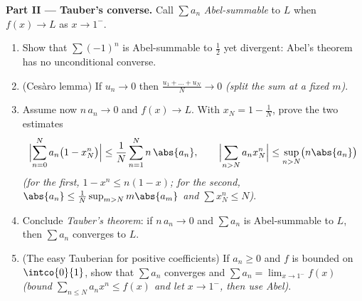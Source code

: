 \begin{problem}
\medskip
\noindent\textbf{Part II --- Tauber's converse.} Call $\sum
a_n$ \emph{Abel-summable} to $L$ when $f(x) \to L$ as $x \to
1^-$.
\begin{enumerate}[resume]
  \item Show that $\sum (-1)^n$ is Abel-summable to $\frac12$
        yet divergent: Abel's theorem has no unconditional
        converse.
  \item (Ces\`aro lemma) If $u_n \to 0$ then $\frac{u_1 + \dots
        + u_N}{N} \to 0$ \emph{(split the sum at a fixed $m$)}.
  \item Assume now $n\,a_n \to 0$ and $f(x) \to L$. With $x_N =
        1 - \frac1N$, prove the two estimates
        \[
        \Bigl|\sum_{n=0}^{N} a_n\bigl(1 - x_N^n\bigr)\Bigr|
        \leq \frac{1}{N}\sum_{n=1}^{N} n\,\abs{a_n},
        \qquad
        \Bigl|\sum_{n>N} a_n x_N^n\Bigr|
        \leq \sup_{n>N}\bigl(n\abs{a_n}\bigr)
        \]
        \emph{(for the first, $1 - x^n \leq n(1-x)$; for the
        second, $\abs{a_n} \leq \frac{1}{N}\sup_{m>N}
        m\abs{a_m}$ and $\sum x_N^n \leq N$)}.
  \item Conclude \emph{Tauber's theorem}: if $n\,a_n \to 0$ and
        $\sum a_n$ is Abel-summable to $L$, then $\sum a_n$
        converges to $L$.
  \item (The easy Tauberian for positive coefficients) If $a_n
        \geq 0$ and $f$ is bounded on $\intco{0}{1}$, show that
        $\sum a_n$ converges and $\sum a_n = \lim_{x\to1^-}
        f(x)$ \emph{(bound $\sum_{n\leq N}a_nx^n \leq f(x)$ and
        let $x \to 1^-$, then use Abel)}.
\end{enumerate}


\end{problem}

